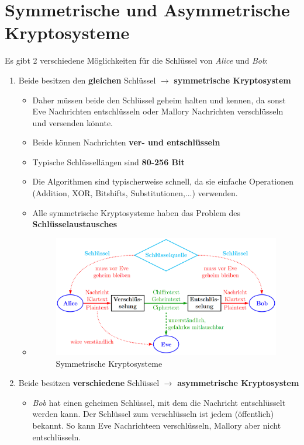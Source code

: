 \section{Symmetrische und Asymmetrische Kryptosysteme}
Es gibt 2 verschiedene Möglichkeiten für die Schlüssel von \textit{Alice} und \textit{Bob}:
\begin{enumerate}
	\item Beide besitzen den \textbf{gleichen} Schlüssel $\rightarrow$ \textbf{symmetrische Kryptosystem}
	\begin{itemize}
		\item Daher müssen beide den Schlüssel geheim halten und kennen, da sonst Eve Nachrichten entschlüsseln oder Mallory Nachrichten verschlüsseln und versenden könnte.
		\item Beide können Nachrichten \textbf{ver- und entschlüsseln}
		\item Typische Schlüssellängen sind \textbf{80-256 Bit}
		\item Die Algorithmen sind typischerweise schnell, da sie einfache Operationen (Addition, XOR, Bitshifts, Substitutionen,...) verwenden.
		\item Alle symmetrische Kryptosysteme haben das Problem des \textbf{Schlüsselaustausches}
		\item[] 
		\begin{figure}[H]
			\centering
			\includegraphics[width=1.0\linewidth]{figures/symmkry.png}
			\caption{Symmetrische Kryptosysteme}
		\end{figure}
	\end{itemize}
	\item Beide besitzen \textbf{verschiedene} Schlüssel $\rightarrow$ \textbf{asymmetrische Kryptosystem}
	\begin{itemize}
		\item \textit{Bob} hat einen geheimen Schlüssel, mit dem die Nachricht entschlüsselt werden kann. Der Schlüssel zum verschlüsseln ist jedem (öffentlich) bekannt. So kann Eve Nachrichteen verschlüsseln, Mallory aber nicht entschlüsseln.

\end{itemize}
\end{enumerate}
